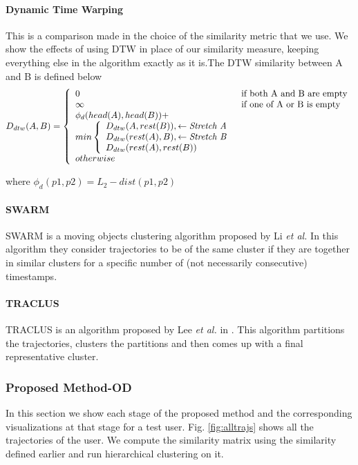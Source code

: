 \paragraph{Dynamic Time Warping}
This is a comparison made in the choice of the similarity metric that we use. We show the effects of using DTW in place of our similarity measure, keeping everything else in the algorithm exactly as it is.The DTW similarity between A and B is defined below 
\begin{equation}
D_{dtw}(A,B) =
\left\{
	\begin{array}{ll}
		0  & \mbox{if } \text{both A and B are empty} \\
		\infty & \mbox{if } \text{one of A or B is empty}\\
                \phi _d (head(A),head(B))+
                   \\min 
\left\{
	\begin{array}{ll}
		D_{dtw}(A,rest(B)), \leftarrow \text{\emph{Stretch A}}\\

		D_{dtw}(rest(A),B),\leftarrow \text{\emph{Stretch B}}\\
                D_{dtw}(rest(A),rest(B)) 
	\end{array}
\right.          \\otherwise
	\end{array}
\right.
\end{equation}

where $\phi_d(p1,p2)=L_2-dist(p1,p2)$ 
\paragraph{SWARM}
SWARM is a moving objects clustering algorithm proposed by Li \emph{et al.}\cite{Li2010}  In this algorithm they consider trajectories to be of the same cluster if they are together in similar clusters for a specific number of (not necessarily consecutive) timestamps. 
\paragraph{TRACLUS}
 TRACLUS is an algorithm proposed by Lee \emph{et al.} in \cite{Lee2007}. This algorithm partitions the trajectories, clusters the partitions and then comes up with a final representative cluster. 


\subsubsection{Proposed Method-OD}
In this section we show each stage of the proposed method and the corresponding visualizations at that stage for a test user. 
Fig. \ref{fig:alltrajs} shows all the trajectories of the user. We compute the similarity matrix using the similarity defined earlier  and run hierarchical clustering on it. 

